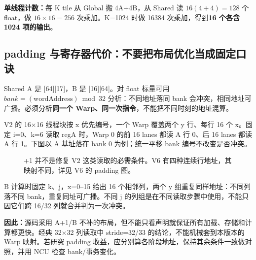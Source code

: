 \textbf{单线程计数：}每 K tile 从 Global 搬 4A+4B，从 Shared 读 $16(4+4)=128$ 个 float，做 $16\times16=256$ 次乘加。K=1024 时做 16384 次乘加，得到\textbf{16 个各含 1024 项的输出}。
\pagebreakhere

\subsection{padding 与寄存器代价：不要把布局优化当成固定口诀}
Shared A 是 [64][17]，B 是 [16][64]。对 float 标量可用 $bank=(\mathrm{wordAddress})\bmod32$ 分析：不同地址落同 bank 会冲突，相同地址可广播\cite{best}。必须分析\textbf{同一个 Warp、同一次指令}，不能把不同时刻的地址混算。

V2 的 16×16 线程块按 x 优先编号，一个 Warp 覆盖两个 y 行、每行 16 个 x。固定 i=0、k=6 读取 regA 时，Warp 0 的前 16 lanes 都读 A 行 0、后 16 lanes 都读 A 行 1。下图以 A 基址落在 bank 0 为例；统一平移 bank 编号不改变是否冲突。
\begin{figure}[H]\centering
{}
\caption{+1 并不是修复 V2 这类读取的必需条件。V6 有四种连续行地址，其映射不同，详见 V6 的 padding 图。}
\end{figure}

B 计算时固定 k、j，x=0--15 给出 16 个相邻列，两个 y 组重复同样地址：不同列落不同 bank，重复同址可广播。不同 j 的列组是在不同读取步骤中使用，不能只因它们跨 16/32 列就合并判为一次冲突。

\textbf{因此：}源码采用 A+1/B 不补的布局，但不能只看声明就保证所有加载、存储和计算都更快。经典 32×32 列读取中 stride=32/33 的结论，不能机械套到本版本的 Warp 映射。若研究 padding 收益，应分别算各阶段地址，保持其余条件一致做对照，并用 NCU 检查 bank/事务变化。

